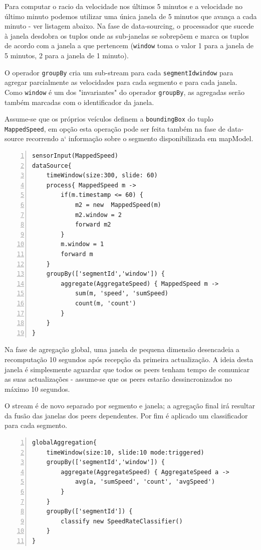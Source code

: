 \documentclass{article}
\newcommand{\tm}[1]{\texttt{#1}}
\begin{document}
Para computar o racio da velocidade nos últimos 5 minutos e a velocidade no último minuto podemos utilizar uma única janela de 5 minutos que avança a cada minuto - ver listagem abaixo. Na fase de data-sourcing, o processador que sucede à janela desdobra os tuplos onde as sub-janelas se sobrepõem e  marca os tuplos de acordo com a janela a que pertencem (\tm{window} toma o valor 1 para a janela de 5 minutos, 2 para a janela de 1 minuto). 

O operador \tm{groupBy} cria um sub-stream para cada \tm{segmentId}\tm{window} para agregar parcialmente as velocidades para cada segmento e para cada janela. Como \tm{window} é um dos "invariantes" do operador \tm{groupBy}, as agregadas serão também marcadas com o identificador da janela.

Assume-se que os próprios veículos definem a \tm{boundingBox} do tuplo \tm{MappedSpeed}, em opção esta operação pode ser feita também na fase de data-source recorrendo a` informação sobre o segmento disponibilizada em mapModel.

\begin{Verbatim}[numbers=left]
sensorInput(MappedSpeed)
dataSource{
	timeWindow(size:300, slide: 60)
	process{ MappedSpeed m ->
		if(m.timestamp <= 60) {
			m2 = new  MappedSpeed(m)
			m2.window = 2
			forward m2
		} 
		m.window = 1
		forward m 
	}
	groupBy(['segmentId','window']) {
		aggregate(AggregateSpeed) { MappedSpeed m ->
			sum(m, 'speed', 'sumSpeed)
			count(m, 'count')
		}
	}
}
\end{Verbatim}


Na fase de agregação global, uma janela de pequena dimensão desencadeia a recomputação 10 segundos após recepção da primeira actualização.  A ideia desta janela é simplesmente aguardar que todos os peers tenham tempo de comunicar as suas actualizações - assume-se que os peers estarão dessincronizados no máximo 10 segundos.

O stream é de novo separado por segmento e janela; a agregação final irá resultar da fusão das janelas dos peers dependentes. Por fim é aplicado um classificador para cada segmento. 

\begin{Verbatim}[numbers=left]
globalAggregation{
	timeWindow(size:10, slide:10 mode:triggered)
	groupBy(['segmentId','window']) {
		aggregate(AggregateSpeed) { AggregateSpeed a ->
			avg(a, 'sumSpeed', 'count', 'avgSpeed')
		}
	}
	groupBy(['segmentId']) {
		classify new SpeedRateClassifier()
	}
}

\end{Verbatim}
\end{document}
